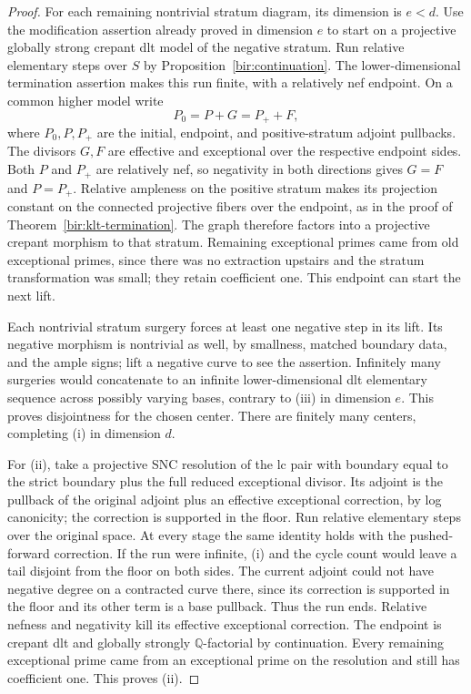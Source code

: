 \documentclass[11pt,letterpaper]{article}
\newcommand{\Q}{\mathbb{Q}}
\theoremstyle{definition}
\theoremstyle{remark}
\begin{document}
\begin{proof}
For each remaining nontrivial stratum diagram, its dimension is
$e<d$.  Use the modification assertion already proved in dimension
$e$ to start on a projective globally strong crepant dlt model of
the negative stratum.  Run relative elementary steps over $S$ by
Proposition~\ref{bir:continuation}.  The lower-dimensional
termination assertion makes this run finite, with a relatively nef
endpoint.  On a common higher model write
\begin{equation}
 P_0=P+G=P_++F,
 \label{bir:dlt-lift}
\end{equation}
where $P_0,P,P_+$ are the initial, endpoint, and positive-stratum
adjoint pullbacks.  The divisors $G,F$ are effective and exceptional
over the respective endpoint sides.  Both $P$ and $P_+$ are
relatively nef, so negativity in both directions gives $G=F$ and
$P=P_+$.  Relative ampleness on the positive stratum makes its
projection constant on the connected projective fibers over the
endpoint, as in the proof of Theorem~\ref{bir:klt-termination}.
The graph therefore factors into a projective crepant morphism to
that stratum.  Remaining exceptional primes came from old
exceptional primes, since there was no extraction upstairs and the
stratum transformation was small; they retain coefficient one.
This endpoint can start the next lift.

Each nontrivial stratum surgery forces at least one negative step
in its lift.  Its negative morphism is nontrivial as well, by
smallness, matched boundary data, and the ample signs; lift a
negative curve to see the assertion.  Infinitely many surgeries
would concatenate to an infinite lower-dimensional dlt elementary
sequence across possibly varying bases, contrary to (iii) in
dimension $e$.  This proves disjointness for the chosen center.
There are finitely many centers, completing (i) in dimension $d$.

For (ii), take a projective SNC resolution of the lc pair with
boundary equal to the strict boundary plus the full reduced
exceptional divisor.  Its adjoint is the pullback of the original
adjoint plus an effective exceptional correction, by log canonicity;
the correction is supported in the floor.  Run relative elementary
steps over the original space.  At every stage the same identity
holds with the pushed-forward correction.  If the run were
infinite, (i) and the cycle count would leave a tail disjoint from
the floor on both sides.  The current adjoint could not have
negative degree on a contracted curve there, since its correction
is supported in the floor and its other term is a base pullback.
Thus the run ends.  Relative nefness and negativity kill its
effective exceptional correction.  The endpoint is crepant dlt
and globally strongly $\Q$-factorial by continuation.  Every
remaining exceptional prime came from an exceptional prime on
the resolution and still has coefficient one.  This proves (ii).


\end{proof}
\end{document}
